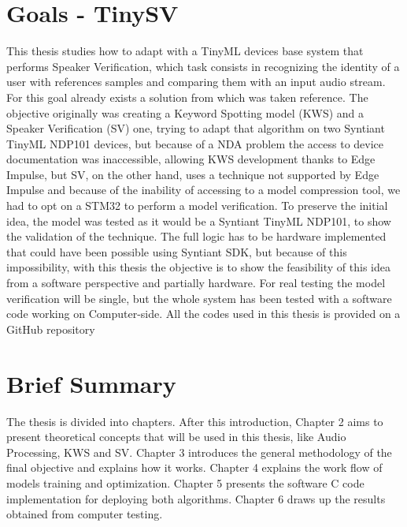 \section{Goals - TinySV}
\label{sec:tinysv}
This thesis studies how to adapt with a TinyML devices base system that performs Speaker Verification, which task consists in recognizing the identity of a user with references samples and comparing them with an input audio stream. For this goal already exists a solution from which was taken reference\cite{dvector_extractor_TinySV}. The objective originally was creating a Keyword Spotting model (KWS) and a Speaker Verification (SV) one, trying to adapt that algorithm on two Syntiant TinyML NDP101 devices, but because of a NDA problem the access to device documentation was inaccessible, allowing KWS development thanks to Edge Impulse\cite{edgeimpulse_syntiant_tinyml}, but SV, on the other hand, uses a technique not supported by Edge Impulse and because of the inability of accessing to a model compression tool, we had to opt on a STM32 to perform a model verification. To preserve the initial idea, the model was tested as it would be a Syntiant TinyML NDP101, to show the validation of the technique. The full logic has to be hardware implemented that could have been possible using Syntiant SDK, but because of this impossibility, with this thesis the objective is to show the feasibility of this idea from a software perspective and partially hardware. For real testing the model verification will be single, but the whole system has been tested with a software code working on Computer-side. All the codes used in this thesis is provided on a GitHub repository\footnotemark{}
\section{Brief Summary}
The thesis is divided into chapters. After this introduction, Chapter 2 aims to present theoretical concepts that will be used in this thesis, like Audio Processing, KWS and SV. Chapter 3 introduces the general methodology of the final objective and explains how it works. Chapter 4 explains the work flow of models training and optimization. Chapter 5 presents the software C code implementation for deploying both algorithms. Chapter 6 draws up the results obtained from computer testing.
\newpage
